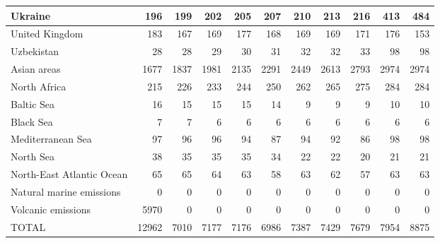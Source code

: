 \begin{table}
\begin{tabular}{|l|r|r|r|r|r|r|r|r|r|r|}
                       Ukraine&    196&    199&    202&    205&    207&    210&    213&    216&    413&    484\\\hline
                United Kingdom&    183&    167&    169&    177&    168&    169&    169&    171&    176&    153\\\hline
                    Uzbekistan&     28&     28&     29&     30&     31&     32&     32&     33&     98&     98\\\hline
                   Asian areas&   1677&   1837&   1981&   2135&   2291&   2449&   2613&   2793&   2974&   2974\\\hline
                  North Africa&    215&    226&    233&    244&    250&    262&    265&    275&    284&    284\\\hline
                    Baltic Sea&     16&     15&     15&     15&     14&      9&      9&      9&     10&     10\\\hline
                     Black Sea&      7&      7&      6&      6&      6&      6&      6&      6&      6&      6\\\hline
             Mediterranean Sea&     97&     96&     96&     94&     87&     94&     92&     86&     98&     98\\\hline
                     North Sea&     38&     35&     35&     35&     34&     22&     22&     20&     21&     21\\\hline
     North-East Atlantic Ocean&     65&     65&     64&     63&     58&     63&     62&     57&     63&     63\\\hline
      Natural marine emissions&      0&      0&      0&      0&      0&      0&      0&      0&      0&      0\\\hline
            Volcanic emissions&   5970&      0&      0&      0&      0&      0&      0&      0&      0&      0\\\hline\hline
                         TOTAL&  12962&   7010&   7177&   7176&   6986&   7387&   7429&   7679&   7954&   8875\\\hline
 \end{tabular}
 \end{table}
 
